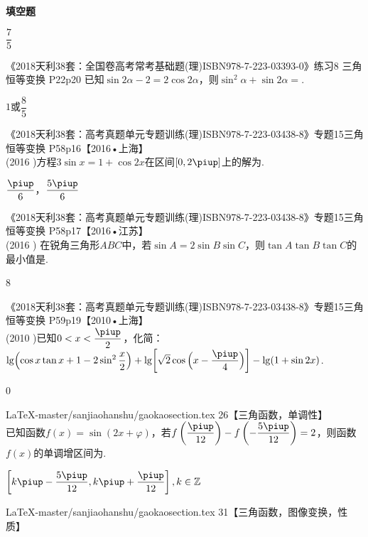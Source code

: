 \begin{exercise}{\bf 填空题}
\begin{answer}
        $\dfrac{7}5$
      \end{answer}
    \item 《2018天利38套：全国卷高考常考基础题(理)ISBN978-7-223-03393-0》练习8 三角恒等变换 P22p20
      已知$\sin{2\alpha}-2=2\cos{2\alpha}$，则$\sin^2\alpha+\sin{2\alpha}=$\tk.
      \begin{answer}
        $1$或$\dfrac{8}5$
      \end{answer}
    \item 《2018天利38套：高考真题单元专题训练(理)ISBN978-7-223-03438-8》专题15三角恒等变换 P58p16【2016•上海】\\
      (2016 )方程$3\sin x=1+\cos{2x}$在区间$[0,2\piup]$上的解为\tk.
      \begin{answer}
        $\dfrac{\piup}6$，$\dfrac{5\piup}6$
      \end{answer}
    \item 《2018天利38套：高考真题单元专题训练(理)ISBN978-7-223-03438-8》专题15三角恒等变换 P58p17【2016•江苏】\\
      (2016 )
      在锐角三角形$ABC$中，若$\sin{A}=2\sin{B}\sin{C}$，则$\tan{A}\tan{B}\tan{C}$的最小值是\tk.
      \begin{answer}
        8
      \end{answer}
    \item 《2018天利38套：高考真题单元专题训练(理)ISBN978-7-223-03438-8》专题15三角恒等变换 P59p19【2010•上海】\\
      (2010 )已知$0<x<\dfrac{\piup}2$，化简：\\
      $\lg\Bigl(\cos x\tan x+1-2\sin^2{\dfrac{x}2}\Bigr)+\lg\biggl[\sqrt{2}\cos {\Bigl(x-\dfrac{\piup}4\Bigr)}\biggr]-\lg(1+\sin{2x})$.
      \begin{answer}
        0
      \end{answer}
    \item LaTeX-master/sanjiaohanshu/gaokaosection.tex 26【三角函数，单调性】\\
      已知函数$f(x)=\sin (2x+\varphi)$，若$    f\left(\dfrac{\piup}{12}\right)-f\left(-\dfrac{5\piup}{12}\right)=2 $，则函数$f(x)$的单调增区间为\tk.
      \begin{answer}
        $\left[k\piup-\dfrac{5\piup}{12},k\piup+\dfrac{\piup}{12}\right],k\in\mathbb{Z}$
      \end{answer}
    \item LaTeX-master/sanjiaohanshu/gaokaosection.tex 31【三角函数，图像变换，性质】\\

\end{exercise}
